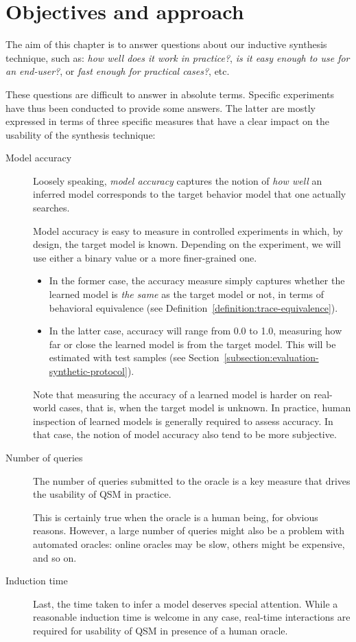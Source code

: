 \section{Objectives and approach\label{section:evaluation-objectives-and-approach}}

The aim of this chapter is to answer questions about our inductive synthesis technique, such as: \emph{how well does it work in practice?}, \emph{is it easy enough to use for an end-user?}, or \emph{fast enough for practical cases?}, etc. 

These questions are difficult to answer in absolute terms. Specific experiments have thus been conducted to provide some answers. The latter are mostly expressed in terms of three specific measures that have a clear impact on the usability of the synthesis technique:
\begin{description}
\item[Model accuracy] Loosely speaking, \emph{model accuracy} captures the notion of \emph{how well} an inferred model corresponds to the target behavior model that one actually searches. 

Model accuracy is easy to measure in controlled experiments in which, by design, the target model is known. Depending on the experiment, we will use either a binary value or a more finer-grained one.
\begin{itemize}
\item In the former case, the accuracy measure simply captures whether the learned model is \emph{the same} as the target model or not, in terms of behavioral equivalence (see Definition~\ref{definition:trace-equivalence}).
\item In the latter case, accuracy will range from 0.0 to 1.0, measuring how far or close the learned model is from the target model. This will be estimated with test samples (see Section~\ref{subsection:evaluation-synthetic-protocol}).
\end{itemize}

Note that measuring the accuracy of a learned model is harder on real-world cases, that is, when the target model is unknown. In practice, human inspection of learned models is generally required to assess accuracy. In that case, the notion of model accuracy also tend to be more subjective. 

\item[Number of queries] The number of queries submitted to the oracle is a key measure that drives the usability of QSM in practice. 

This is certainly true when the oracle is a human being, for obvious reasons. However, a large number of queries might also be a problem with automated oracles: online oracles may be slow, others might be expensive, and so on.

\item[Induction time] Last, the time taken to infer a model deserves special attention. While a reasonable induction time is welcome in any case, real-time interactions are required for usability of QSM in presence of a human oracle.
\end{description}

